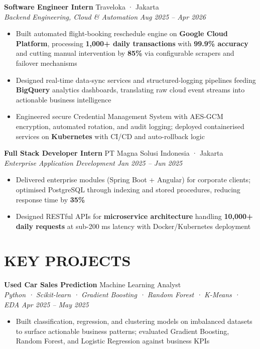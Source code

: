 \documentclass[10pt,a4paper]{article}
\newcommand{\experienceheader}[4]{
    \textbf{#1} \hfill #2 \\
    \textit{#3} \hfill \textit{#4}
}
\begin{document}
\experienceheader{Software Engineer Intern}{Traveloka · Jakarta}{Backend Engineering, Cloud \& Automation}{Aug 2025 -- Apr 2026}
\begin{itemize}[leftmargin=*, itemsep=1pt, topsep=1pt]
    \item Built automated flight-booking reschedule engine on \textbf{Google Cloud Platform}, processing \textbf{1,000+ daily transactions} with \textbf{99.9\% accuracy} and cutting manual intervention by \textbf{85\%} via configurable scrapers and failover mechanisms
    \item Designed real-time data-sync services and structured-logging pipelines feeding \textbf{BigQuery} analytics dashboards, translating raw cloud event streams into actionable business intelligence
    \item Engineered secure Credential Management System with AES-GCM encryption, automated rotation, and audit logging; deployed containerised services on \textbf{Kubernetes} with CI/CD and auto-rollback logic
\end{itemize}

\vspace{2pt}

\experienceheader{Full Stack Developer Intern}{PT Magna Solusi Indonesia · Jakarta}{Enterprise Application Development}{Jan 2025 -- Jun 2025}
\begin{itemize}[leftmargin=*, itemsep=1pt, topsep=1pt]
    \item Delivered enterprise modules (Spring Boot + Angular) for corporate clients; optimised PostgreSQL through indexing and stored procedures, reducing response time by \textbf{35\%}
    \item Designed RESTful APIs for \textbf{microservice architecture} handling \textbf{10,000+ daily requests} at sub-200 ms latency with Docker/Kubernetes deployment
\end{itemize}

\vspace{-4pt}

\section*{KEY PROJECTS}

\experienceheader{Used Car Sales Prediction}{Machine Learning Analyst}{Python · Scikit-learn · Gradient Boosting · Random Forest · K-Means · EDA}{Apr 2025 -- May 2025}
\begin{itemize}[leftmargin=*, itemsep=0.5pt, topsep=1pt]
    \item Built classification, regression, and clustering models on imbalanced datasets to surface actionable business patterns; evaluated Gradient Boosting, Random Forest, and Logistic Regression against business KPIs
\end{itemize}
\end{document}
